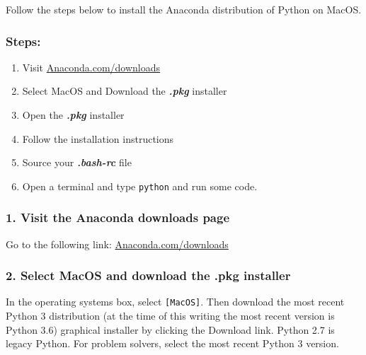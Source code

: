 \documentclass{book}
\begin{document}
Follow the steps below to install the Anaconda distribution of Python on
MacOS.

\subsubsection{Steps:}\label{steps}

\begin{enumerate}
\def\labelenumi{\arabic{enumi}.}
\item
  Visit
  \href{https://www.anaconda.com/download/}{Anaconda.com/downloads}
\item
  Select MacOS and Download the \textbf{\emph{.pkg}} installer
\item
  Open the \textbf{\emph{.pkg}} installer
\item
  Follow the installation instructions
\item
  Source your \textbf{\emph{.bash-rc}} file
\item
  Open a terminal and type \lstinline!python! and run some code.
\end{enumerate}
    




    
        \subsubsection{1. Visit the Anaconda downloads
page}\label{visit-the-anaconda-downloads-page}

Go to the following link:
\href{https://www.anaconda.com/download/}{Anaconda.com/downloads}
    




    
        \subsubsection{2. Select MacOS and download the .pkg
installer}\label{select-macos-and-download-the-.pkg-installer}

In the operating systems box, select \lstinline![MacOS]!. Then download
the most recent Python 3 distribution (at the time of this writing the
most recent version is Python 3.6) graphical installer by clicking the
Download link. Python 2.7 is legacy Python. For problem solvers, select
the most recent Python 3 version.
\end{document}
